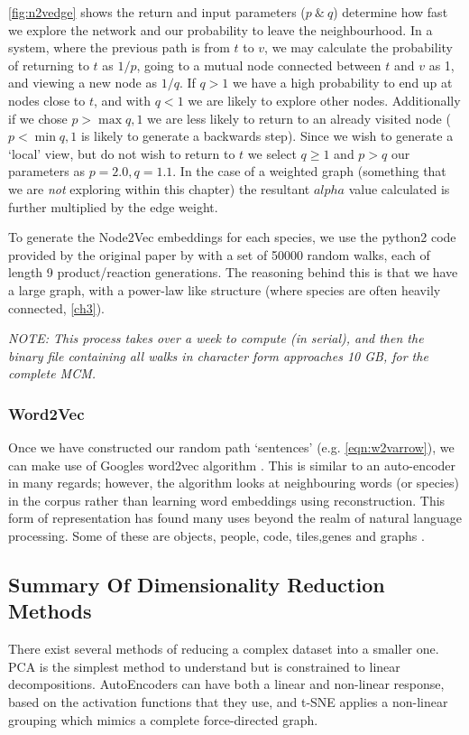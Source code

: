  \autoref{fig:n2vedge} shows the return and input parameters ($p\ \&\ q$) determine how fast we explore the network and our probability to leave the neighbourhood. In a system, where the previous path is from $t$ to $v$, we may calculate the probability of returning to $t$ as $1/p$, going to a mutual node connected between $t$ and $v$ as 1, and viewing a new node as $1/q$.
If $q>1$ we have a high probability to end up at nodes close to $t$, and with $q<1$ we are likely to explore other nodes. Additionally if we chose $p> \max{q,1}$ we are less likely to return to an already visited node ($p < \min{q,1}$ is likely to generate a backwards step). Since we wish to generate a `local' view, but do not wish to return to $t$ we select  $q \ge 1$ and $p > q$ our parameters as  $p = 2.0,q=1.1$.  In the case of a weighted graph (something that we are \textit{not} exploring within this chapter) the resultant $alpha$ value calculated is further multiplied by the edge weight.

To generate the Node2Vec embeddings for each species, we use the python2 code provided by the original paper by \cite{node2vec} with a set of 50000 random walks, each of length 9 product/reaction generations. The reasoning behind this is that we have a large graph, with a power-law like structure (where species are often heavily connected, \autoref{ch3}).

\textit{NOTE: This process takes over a week to compute (in serial), and then the binary file containing all walks in character form approaches 10 GB, for the complete MCM. }




\subsubsection{Word2Vec}\label{sec:w2v}
Once we have constructed our random path `sentences' (e.g. \autoref{eqn:w2varrow}), we can make use of Googles word2vec algorithm \citep{w2v}. This is similar to an auto-encoder in many regards; however, the algorithm looks at neighbouring words (or species) in the corpus rather than learning word embeddings using reconstruction. This form of representation has found many uses beyond the realm of natural language processing. Some of these are objects, people, code, tiles,genes and graphs \citep{objects,people,code,tile,gene,graph2vec}.


%
%

\subsection{Summary Of Dimensionality Reduction Methods}
There exist several methods of reducing a complex dataset into a smaller one. PCA is the simplest method to understand but is constrained to linear decompositions. AutoEncoders can have both a linear and non-linear response, based on the activation functions that they use, and t-SNE applies a non-linear grouping which mimics a complete force-directed graph.

